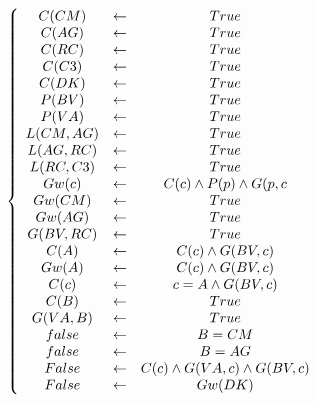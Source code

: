\documentclass[alternative-exam.tex]{subfiles}
\begin{document}
\[
\left\{
\begin{array}{c c c}
C(CM) &\leftarrow& True\\
C(AG) &\leftarrow& True\\
C(RC) &\leftarrow& True\\
C(C3) &\leftarrow& True\\
C(DK) &\leftarrow& True\\
P(BV) &\leftarrow& True\\
P(VA) &\leftarrow& True\\
L(CM,AG) &\leftarrow& True\\
L(AG,RC) &\leftarrow& True\\
L(RC,C3) &\leftarrow& True\\
Gw(c) &\leftarrow& C(c) \wedge P(p) \wedge G(p,c\\
Gw(CM) &\leftarrow& True\\
Gw(AG) &\leftarrow& True\\
G(BV,RC) &\leftarrow& True\\
C(A) &\leftarrow&  C(c) \wedge  G(BV,c)\\
Gw(A) &\leftarrow&  C(c) \wedge  G(BV,c)\\
C(c) &\leftarrow& c = A \wedge G(BV,c)\\
C(B) &\leftarrow& True\\
G(VA,B) &\leftarrow& True\\
false &\leftarrow& B = CM\\
false &\leftarrow& B = AG\\
False &\leftarrow& C(c) \wedge G(VA,c) \wedge G(BV,c)\\
False &\leftarrow& Gw(DK)\\
\end{array}
\right.
\]
\end{document}

